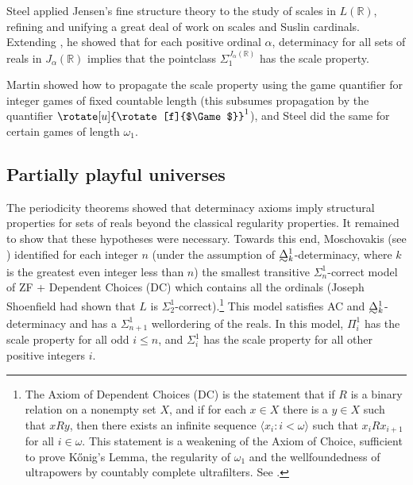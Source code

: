 \documentclass{book}%
\newcommand{\game}{\rotate[u]{\rotate[f]{$\Game$}}}
\def\underTilde#1{{\baselineskip=0pt\vtop{\hbox{$#1$}\hbox{$\sim$}}}{}}
\newcommand{\uTDelta}{\underTilde{\Delta}}
\begin{document}
Steel  applied Jensen's fine structure theory
 to the study of scales in $L(\mathbb{R})$,
refining and unifying a great deal of work on scales and Suslin
cardinals. Extending \cite{MartinSteel:1983}, he showed that for
each positive ordinal $\alpha$, determinacy for all sets of reals in
$J_{\alpha}(\mathbb{R})$ implies that the pointclass
$\Sigma_{1}^{J_{\alpha}(\mathbb{R})}$ has the scale property.



Martin  showed how
to propagate the scale property using the game quantifier for integer games
of fixed countable length (this subsumes propagation by the quantifier $\game^{1}$), and Steel
 did the same for certain games of length $\omega_{1}$.





\subsection{Partially playful universes}

The periodicity theorems showed that determinacy axioms imply structural properties for sets of reals
beyond the classical regularity properties. It remained to show that these hypotheses were necessary.
Towards this end, Moschovakis (see \cite{Becker:1978}) identified for each integer $n$ (under the
assumption of $\uTDelta^{1}_{k}$-determinacy, where $k$ is the
greatest even integer less than $n$) the smallest transitive
$\Sigma^{1}_{n}$-correct model of ZF + Dependent Choices (DC)
which contains all the ordinals (Joseph Shoenfield  had shown
that $L$ is $\Sigma^{1}_{2}$-correct).\footnote{The Axiom of
Dependent Choices (DC)
is the statement that if $R$ is a binary
relation on a nonempty set $X$, and if for each $x \in X$ there is a
$y \in X$ such that $x R y$, then there exists an infinite sequence
$\langle x_{i} : i < \omega \rangle$ such that $x_{i} R x_{i+1}$ for
all $i \in \omega$. This statement is a weakening of the Axiom of
Choice, sufficient to prove K\H{o}nig's Lemma, the regularity of $\omega_{1}$ and the
wellfoundedness of ultrapowers by countably complete ultrafilters. See
\cite{Jech:settheory}.}  This model satisfies AC and
$\uTDelta^{1}_{k}$-determinacy and has a $\Sigma^{1}_{n+1}$
wellordering of the reals. In this model, $\Pi^{1}_{i}$ has the
scale property for all odd $i \leq n$, and $\Sigma^{1}_{i}$ has the
scale property for all other positive integers $i$.
\end{document}
